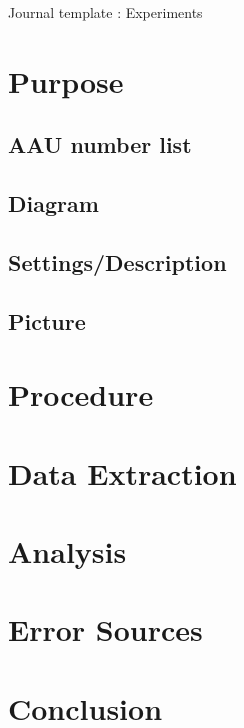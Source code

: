 \documentclass[12pt,a4paper]{article}
\begin{document}
\begin{Huge}
\begin{center}
Journal template : Experiments
\end{center}
\end{Huge}


\vspace{1cm}
\section{Purpose}
\subsection{AAU number list}
\subsection{Diagram}
\subsection{Settings/Description}
\subsection{Picture}
\vspace{1cm}
\section{Procedure}
\vspace{1cm}
\section{Data Extraction}
\vspace{1cm}
\section{Analysis}
\vspace{1cm}
\section{Error Sources}
\vspace{1cm}
\section{Conclusion}
\end{document}
